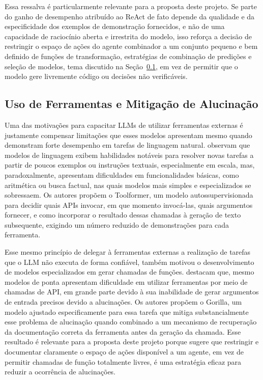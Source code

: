 Essa ressalva é particularmente relevante para a proposta deste projeto. Se parte do ganho de desempenho atribuído ao ReAct de fato depende da qualidade e da especificidade dos exemplos de demonstração fornecidos, e não de uma capacidade de raciocínio aberta e irrestrita do modelo, isso reforça a decisão de restringir o espaço de ações do agente combinador a um conjunto pequeno e bem definido de funções de transformação, estratégias de combinação de predições e seleção de modelos, tema discutido na Seção~\ref{subsec:uso-ferramentas}, em vez de permitir que o modelo gere livremente código ou decisões não verificáveis.




\subsection{Uso de Ferramentas e Mitigação de Alucinação}
\label{subsec:uso-ferramentas}

Uma das motivações para capacitar LLMs de utilizar ferramentas externas é justamente compensar limitações que esses modelos apresentam mesmo quando demonstram forte desempenho em tarefas de linguagem natural. \citet{schick2023toolformer} observam que modelos de linguagem exibem habilidades notáveis para resolver novas tarefas a partir de poucos exemplos ou instruções textuais, especialmente em escala, mas, paradoxalmente, apresentam dificuldades em funcionalidades básicas, como aritmética ou busca factual, nas quais modelos mais simples e especializados se sobressaem. Os autores propõem o Toolformer, um modelo autossupervisionada para decidir quais APIs invocar, em que momento invocá-las, quais argumentos fornecer, e como incorporar o resultado dessas chamadas à geração de texto subsequente, exigindo um número reduzido de demonstrações para cada ferramenta.

Esse mesmo princípio de delegar à ferramentas externas a realização de tarefas que o LLM não executa de forma confiável, também motivou o desenvolvimento de modelos especializados em gerar chamadas de funções. \citet{patil2023gorilla} destacam que, mesmo modelos de ponta apresentam dificuldade em utilizar ferramentas por meio de chamadas de API, em grande parte devido à sua inabilidade de gerar argumentos de entrada precisos devido a alucinações. Os autores propõem o Gorilla, um modelo ajustado especificamente para essa tarefa que mitiga substancialmente esse problema de alucinação quando combinado a um mecanismo de recuperação da documentação correta da ferramenta antes da geração da chamada. Esse resultado é relevante para a proposta deste projeto porque sugere que restringir e documentar claramente o espaço de ações disponível a um agente, em vez de permitir chamadas de função totalmente livres, é uma estratégia eficaz para reduzir a ocorrência de alucinações.

